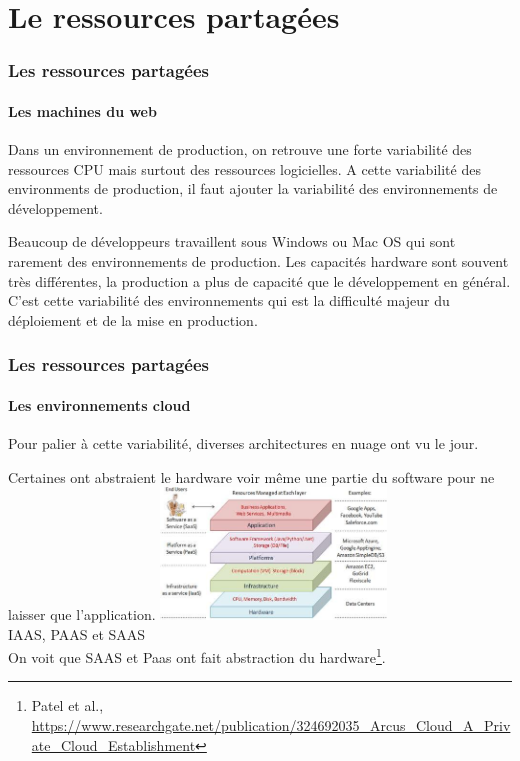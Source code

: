 \documentclass{beamer}
\begin{document}
    \section{Le ressources partagées}\label{sec:le-ressources-partagees}

    \begin{frame}
        \transdissolve
        \frametitle{Les ressources partagées}
        \framesubtitle{Les machines du web}
        Dans un environnement de production, on retrouve une forte variabilité des ressources CPU mais surtout des ressources logicielles.
        \bigbreak
        A cette variabilité des environments de production, il faut ajouter la variabilité des environnements de développement.

        Beaucoup de développeurs travaillent sous Windows ou Mac OS qui sont rarement des environnements de production.
        Les capacités hardware sont souvent très différentes, la production a plus de capacité que le développement en général.
        \bigbreak
        C'est cette variabilité des environnements qui est la difficulté majeur du déploiement et de la mise en production.
    \end{frame}

    \begin{frame}
        \transdissolve
        \frametitle{Les ressources partagées}
        \framesubtitle{Les environnements cloud}
        Pour palier à cette variabilité, diverses architectures en nuage ont vu le jour.

        Certaines ont abstraient le hardware voir même une partie du software pour ne laisser que l'application.
        \bigbreak
        \centering
        \includegraphics[width=6cm]{image/cloud-stacks} \\ IAAS, PAAS et SAAS\\
        \flushleft
        On voit que SAAS et Paas ont fait abstraction du hardware\footnote{\label{arcuscloud}Patel et al., \url{https://www.researchgate.net/publication/324692035_Arcus_Cloud_A_Private_Cloud_Establishment}}.
    \end{frame}
\end{document}
